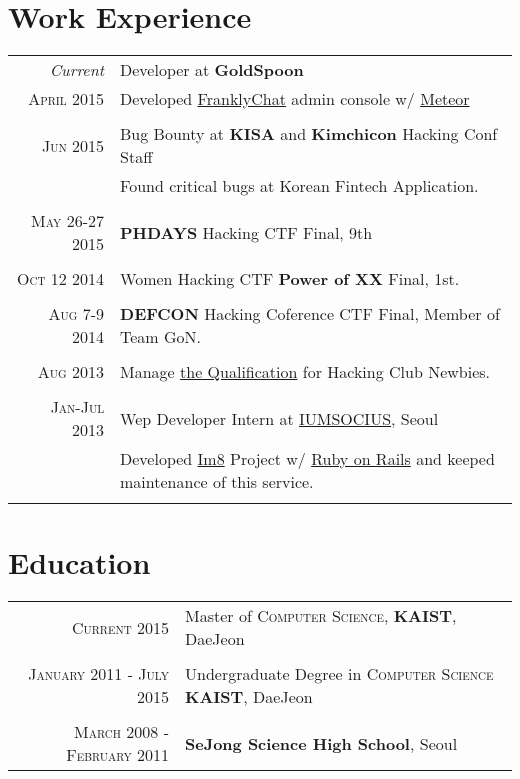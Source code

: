 \documentclass[a4paper,10pt]{article}
\begin{document}
\section{Work Experience}
\begin{tabular}{r|p{11cm}}
    \emph{Current} & Developer at \textbf{GoldSpoon}  \\\textsc{April 2015}&\footnotesize{Developed \href{http://www.franklychat.com/}{FranklyChat} admin console w/ \href{https://www.meteor.com/}{Meteor}}\\\multicolumn{2}{c}{} \\
    \textsc{Jun 2015} & Bug Bounty at \textbf{KISA} and \textbf{Kimchicon} Hacking Conf Staff \\&\footnotesize{Found critical bugs at Korean Fintech Application.}\\\multicolumn{2}{c}{} \\
    \textsc{May 26-27 2015} & \textbf{PHDAYS} Hacking CTF Final, 9th \\\multicolumn{2}{c}{} \\
    \textsc{Oct 12 2014} & Women Hacking CTF \textbf{Power of XX} Final, 1st.\\\multicolumn{2}{c}{} \\
    \textsc{Aug 7-9 2014} & \textbf{DEFCON} Hacking Coference CTF Final, Member of Team GoN.\\\multicolumn{2}{c}{} \\
    \textsc{Aug 2013} & Manage \href{http://ubunt32.kaist.ac.kr:3000}{the Qualification} for Hacking Club Newbies.\\\multicolumn{2}{c}{} \\
    \textsc{Jan-Jul 2013} & Wep Developer Intern at \textsc{\href{http://www.iumsocius.com/}{IUMSOCIUS}}, Seoul \\&\footnotesize{Developed \href{http://www.im8.net/}{Im8} Project w/ \href{http://rubyonrails.org/}{Ruby on Rails} and keeped maintenance of this service.}\\\multicolumn{2}{c}{} \\
\end{tabular}

\section{Education}
\begin{tabular}{rl}	
 \textsc{Current} 2015 & Master of \textsc{Computer Science}, \textbf{KAIST}, DaeJeon\\&\\
\textsc{January 2011 - July 2015} & Undergraduate Degree in \textsc{Computer Science} \normalsize\textbf{KAIST}, DaeJeon\\&\\
\textsc{March 2008 - February 2011}&  \textbf{SeJong Science High School}, Seoul\\
\end{tabular}
\end{document}
